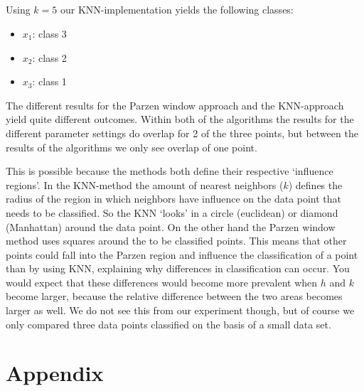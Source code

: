 \documentclass[10pt]{article}
\begin{document}
\subsection{}
Using $k=5$ our KNN-implementation yields the following classes:
\begin{itemize}
 \item $x_1$: class 3
 \item $x_2$: class 2
 \item $x_3$: class 1
\end{itemize}

The different results for the Parzen window approach and the KNN-approach yield quite different outcomes. Within both of the algorithms the results for the different parameter settings do overlap for 2 of the three points, but between the results of the algorithms we only see overlap of one point. 

This is possible because the methods both define their respective `influence regions'. In the KNN-method the amount of nearest neighbors ($k$) defines the radius of the region in which neighbors have influence on the data point that needs to be classified. So the KNN `looks' in a circle (euclidean) or diamond (Manhattan) around the data point. On the other hand the Parzen window method uses squares around the to be classified points. This means that other points could fall into the Parzen region and influence the classification of a point than by using KNN, explaining why differences in classification can occur. You would expect that these differences would become more prevalent when $h$ and $k$ become larger, because the relative difference between the two areas becomes larger as well. We do not see this from our experiment though, but of course we only compared three data points classified on the basis of a small data set.

\section*{Appendix}






\end{document}
